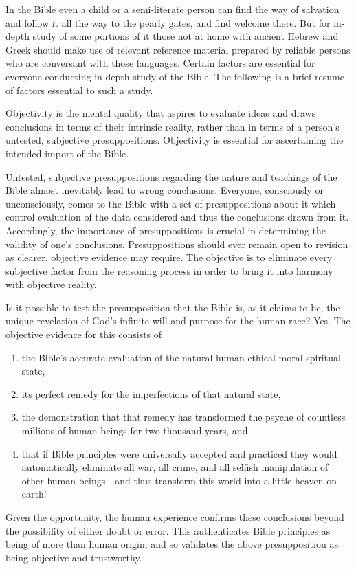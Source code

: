 In the Bible even a child or a semi-literate person can find the way of
salvation and follow it all the way to the pearly gates, and find welcome
there. But for in-depth study of some portions of it those not at home with
ancient Hebrew and Greek should make use of relevant reference material
prepared by reliable persons who are conversant with those languages.
Certain factors are essential for everyone conducting in-depth study of the
Bible. The following is a brief resume of factors essential to such a study.

Objectivity is the mental quality that aspires to evaluate ideas and draws
conclusions in terms of their intrinsic reality, rather than in terms of a
person's untested, subjective presuppositions. Objectivity is essential for
ascertaining the intended import of the Bible.

Untested, subjective presuppositions regarding the nature and teachings of
the Bible almost inevitably lead to wrong conclusions. Everyone, consciously
or unconsciously, comes to the Bible with a set of presuppositions about it
which control evaluation of the data considered and thus the conclusions
drawn from it. Accordingly, the importance of presuppositions is crucial in
determining the validity of one's conclusions. Presuppositions should ever
remain open to revision as clearer, objective evidence may require. The
objective is to eliminate every subjective factor from the reasoning process
in order to bring it into harmony with objective reality.

Is it possible to test the presupposition that the Bible is, as it claims to
be, the unique revelation of God's infinite will and purpose for the human
race? Yes. The objective evidence for this consists of 
\begin{enumerate}
    \item the Bible's
accurate evaluation of the natural human ethical-moral-spiritual state, 
    \item its perfect remedy for the imperfections of that natural state,
    \item the
demonstration that that remedy has transformed the psyche of countless
millions of human beings for two thousand years, and
    \item that if Bible
principles were universally accepted and practiced they would automatically
eliminate all war, all crime, and all selfish manipulation of other human
beings---and thus transform this world into a little heaven on earth!
\end{enumerate}
Given
the opportunity, the human experience confirms these conclusions beyond the
possibility of either doubt or error. This authenticates Bible principles as
being of more than human origin, and so validates the above presupposition
as being objective and trustworthy.

